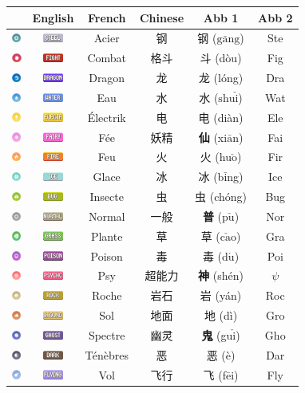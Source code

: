 \documentclass[12pt,UTF8,nofonts]{beamer}
\newcommand{\fightingfull}{\includegraphics[height=0.3cm]{../../images/type/full/Fighting.png}}
\newcommand{\bugfull}{\includegraphics[height=0.3cm]{../../images/type/full/Bug.png}}
\newcommand{\darkfull}{\includegraphics[height=0.3cm]{../../images/type/full/Dark.png}}
\newcommand{\electricfull}{\includegraphics[height=0.3cm]{../../images/type/full/Electric.png}}
\newcommand{\fairyfull}{\includegraphics[height=0.3cm]{../../images/type/full/Fairy.png}}
\newcommand{\firefull}{\includegraphics[height=0.3cm]{../../images/type/full/Fire.png}}
\newcommand{\flyingfull}{\includegraphics[height=0.3cm]{../../images/type/full/Flying.png}}
\newcommand{\ghostfull}{\includegraphics[height=0.3cm]{../../images/type/full/Ghost.png}}
\newcommand{\dragonfull}{\includegraphics[height=0.3cm]{../../images/type/full/Dragon.png}}
\newcommand{\grassfull}{\includegraphics[height=0.3cm]{../../images/type/full/Grass.png}}
\newcommand{\groundfull}{\includegraphics[height=0.3cm]{../../images/type/full/Ground.png}}
\newcommand{\icefull}{\includegraphics[height=0.3cm]{../../images/type/full/Ice.png}}
\newcommand{\normalfull}{\includegraphics[height=0.3cm]{../../images/type/full/Normal.png}}
\newcommand{\psychicfull}{\includegraphics[height=0.3cm]{../../images/type/full/Psychic.png}}
\newcommand{\rockfull}{\includegraphics[height=0.3cm]{../../images/type/full/Rock.png}}
\newcommand{\waterfull}{\includegraphics[height=0.3cm]{../../images/type/full/Water.png}}
\newcommand{\poisonfull}{\includegraphics[height=0.3cm]{../../images/type/full/Poison.png}}
\newcommand{\steelfull}{\includegraphics[height=0.3cm]{../../images/type/full/Steel.png}}
\newcommand{\fightingsimp}{\includegraphics[height=0.3cm]{../../images/type/simplified/fighting.png}}
\newcommand{\dragonsimp}{\includegraphics[height=0.3cm]{../../images/type/simplified/dragon.png}}
\newcommand{\darksimp}{\includegraphics[height=0.3cm]{../../images/type/simplified/dark.png}}
\newcommand{\ghostsimp}{\includegraphics[height=0.3cm]{../../images/type/simplified/ghost.png}}
\newcommand{\psysimp}{\includegraphics[height=0.3cm]{../../images/type/simplified/psy.png}}
\newcommand{\icesimp}{\includegraphics[height=0.3cm]{../../images/type/simplified/ice.png}}
\newcommand{\rocksimp}{\includegraphics[height=0.3cm]{../../images/type/simplified/rock.png}}
\newcommand{\groundsimp}{\includegraphics[height=0.3cm]{../../images/type/simplified/ground.png}}
\newcommand{\electricsimp}{\includegraphics[height=0.3cm]{../../images/type/simplified/electric.png}}
\newcommand{\watersimp}{\includegraphics[height=0.3cm]{../../images/type/simplified/water.png}}
\newcommand{\grasssimp}{\includegraphics[height=0.3cm]{../../images/type/simplified/grass.png}}
\newcommand{\firesimp}{\includegraphics[height=0.3cm]{../../images/type/simplified/fire.png}}
\newcommand{\steelsimp}{\includegraphics[height=0.3cm]{../../images/type/simplified/steel.png}}
\newcommand{\fairysimp}{\includegraphics[height=0.3cm]{../../images/type/simplified/fairy.png}}
\newcommand{\flyingsimp}{\includegraphics[height=0.3cm]{../../images/type/simplified/flying.png}}
\newcommand{\poisonsimp}{\includegraphics[height=0.3cm]{../../images/type/simplified/poison.png}}
\newcommand{\bugsimp}{\includegraphics[height=0.3cm]{../../images/type/simplified/bug.png}}
\newcommand{\normalsimp}{\includegraphics[height=0.3cm]{../../images/type/simplified/normal.png}}
\begin{document}
\begin{frame}
\begin{block}{}
\begin{footnotesize}
\begin{center}
\begin{tabular}{cccccc}
 & English & French & Chinese & Abb 1 & Abb 2 \\ \hline
\steelsimp & \steelfull & Acier  & 钢 & 钢 ($\text{g}\bar{\text{a}}\text{ng}$) & Ste \\
\fightingsimp & \fightingfull & Combat & 格斗 & 斗 (dòu) & Fig \\
\dragonsimp& \dragonfull & Dragon & 龙 & 龙 (lóng) & Dra\\
\watersimp& \waterfull & Eau  & 水 & 水 ($\text{shu}\check{\text{i}}$) & Wat \\
\electricsimp& \electricfull & Électrik  & 电 & 电 (diàn) & Ele \\
\fairysimp& \fairyfull & Fée & 妖精 & \textbf{仙} (xi$\bar{\text{a}}$n) & Fai \\
\firesimp& \firefull & Feu & 火 & 火 (hu$\check{\text{o}}$) & Fir \\
\icesimp&\icefull & Glace & 冰 & 冰 (b$\bar{\text{i}}$ng) & Ice \\
\bugsimp& \bugfull & Insecte & 虫 & 虫 (chóng) & Bug \\
\normalsimp&\normalfull& Normal & 一般 & \textbf{普} (p$\check{\text{u}}$) & Nor\\
\grasssimp&\grassfull& Plante & 草 & 草 (c$\check{\text{a}}$o)& Gra \\
\poisonsimp&\poisonfull& Poison & 毒 & 毒 (d$\acute{\text{u}}$) & Poi \\
\psysimp&\psychicfull& Psy  & 超能力 & \textbf{神} (shén) & $\psi$ \\
\rocksimp & \rockfull & Roche & 岩石 & 岩 (yán) & Roc \\
\groundsimp & \groundfull & Sol  & 地面 & 地 (dì) & Gro \\
\ghostsimp & \ghostfull & Spectre & 幽灵 & \textbf{鬼} (gu$\check{\text{i}}$) & Gho \\
\darksimp & \darkfull & Ténèbres & 恶 & 恶 (è) & Dar \\
\flyingsimp & \flyingfull &  Vol & 飞行 & 飞 (f$\bar{\text{e}}$i) & Fly \\
\end{tabular}
\end{center}

\end{footnotesize}
\end{block}
\end{frame}
\end{document}
